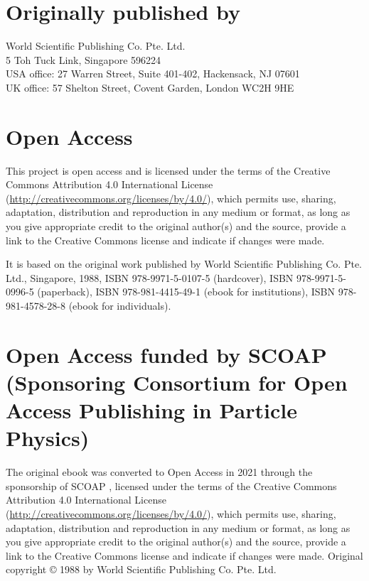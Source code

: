 \hspace*{\fill}

\section*{Originally published by}
World Scientific Publishing Co. Pte. Ltd.\\
5 Toh Tuck Link, Singapore 596224\\
USA office: 27 Warren Street, Suite 401-402, Hackensack, NJ 07601\\
UK office: 57 Shelton Street, Covent Garden, London WC2H 9HE


\section*{Open Access}
This project is open access and is licensed under the terms of the Creative Commons Attribution 4.0 International License (\href{http://creativecommons.org/licenses/by/4.0/}{http://creativecommons.org/licenses/by/4.0/}), which permits use, sharing, adaptation, distribution and reproduction in any medium or format, as long as you give appropriate credit to the original author(s) and the source, provide a link to the Creative Commons license and indicate if changes were made.

It is based on the original work published by World Scientific Publishing Co. Pte. Ltd., Singapore, 1988, ISBN 978-9971-5-0107-5 (hardcover), ISBN 978-9971-5-0996-5 (paperback), ISBN 978-981-4415-49-1 (ebook for institutions), ISBN 978-981-4578-28-8 (ebook for individuals).

\section*{Open Access funded by SCOAP (Sponsoring Consortium for Open Access Publishing in Particle Physics)}
The original ebook was converted to Open Access in 2021 through the sponsorship of SCOAP , licensed under the terms of the Creative Commons Attribution 4.0 International License (\href{http://creativecommons.org/licenses/by/4.0/}{http://creativecommons.org/licenses/by/4.0/}), which permits use, sharing, adaptation, distribution and reproduction in any medium or format, as long as you give appropriate credit to the original author(s) and the source, provide a link to the Creative Commons license and indicate if changes were made.
Original copyright © 1988 by World Scientific Publishing Co. Pte. Ltd.

\newpage

